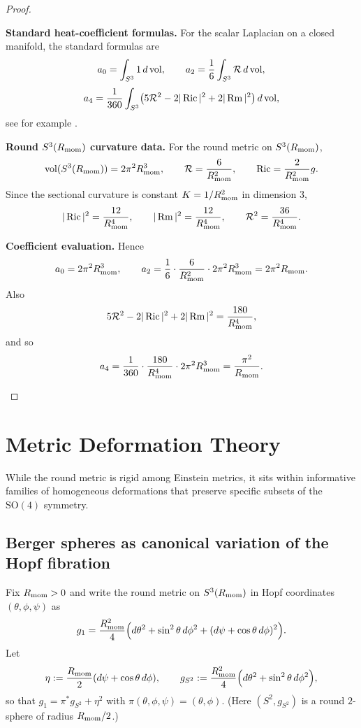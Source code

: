 \documentclass[11pt]{article}
\begin{document}
\begin{proof}

\begin{proofsteps}
\item \textbf{Standard heat-coefficient formulas.}
For the scalar Laplacian on a closed manifold, the standard formulas are
\[
a_0=\int_{S^3}1\,d\operatorname{vol},
\qquad
a_2=\frac16\int_{S^3}\mathcal R\,d\operatorname{vol},
\]
\[
a_4=\frac{1}{360}\int_{S^3}\bigl(5\mathcal R^2-2|\operatorname{Ric}|^2+2|\operatorname{Rm}|^2\bigr)\,d\operatorname{vol},
\]
see for example \cite{berline1992heat,gilkey1995invariance}.

\item \textbf{Round \(S^3(R_{\mathrm{mom}})\) curvature data.}
For the round metric on \(S^3(R_{\mathrm{mom}})\),
\[
\operatorname{vol}(S^3(R_{\mathrm{mom}}))=2\pi^2R_{\mathrm{mom}}^3,\qquad
\mathcal R=\frac{6}{R_{\mathrm{mom}}^2},\qquad
\operatorname{Ric}=\frac{2}{R_{\mathrm{mom}}^2}g.
\]
Since the sectional curvature is constant \(K=1/R_{\mathrm{mom}}^2\) in dimension \(3\),
\[
|\operatorname{Ric}|^2=\frac{12}{R_{\mathrm{mom}}^4},
\qquad
|\operatorname{Rm}|^2=\frac{12}{R_{\mathrm{mom}}^4},
\qquad
\mathcal R^2=\frac{36}{R_{\mathrm{mom}}^4}.
\]

\item \textbf{Coefficient evaluation.}
Hence
\[
a_0=2\pi^2R_{\mathrm{mom}}^3,
\qquad
a_2=\frac16\cdot \frac{6}{R_{\mathrm{mom}}^2}\cdot 2\pi^2R_{\mathrm{mom}}^3
=2\pi^2R_{\mathrm{mom}}.
\]
Also
\[
5\mathcal R^2-2|\operatorname{Ric}|^2+2|\operatorname{Rm}|^2
=
\frac{180}{R_{\mathrm{mom}}^4},
\]
and so
\[
a_4
=
\frac{1}{360}\cdot \frac{180}{R_{\mathrm{mom}}^4}\cdot 2\pi^2R_{\mathrm{mom}}^3
=
\frac{\pi^2}{R_{\mathrm{mom}}}.
\]
\end{proofsteps}
\end{proof}


\section{Metric Deformation Theory}
\label{p1:sec:metric-deformation}

While the round metric is rigid among Einstein metrics, it sits within informative families of homogeneous deformations that preserve specific subsets of the $\mathrm{SO}(4)$ symmetry.


\subsection{Berger spheres as canonical variation of the Hopf fibration}
\label{p1:sec:berger-collapse-rigorous}

Fix $R_{\mathrm{mom}}>0$ and write the round metric on $S^3(R_{\mathrm{mom}})$ in Hopf coordinates $(\theta,\phi,\psi)$ as
\begin{equation}\label{p1:eq:round-hopf}
g_{1}
=\frac{R_{\mathrm{mom}}^2}{4}\Big(d\theta^2+\sin^2\theta\,d\phi^2+(d\psi+\cos\theta\,d\phi)^2\Big).
\end{equation}
Let
\[
\eta:=\frac{R_{\mathrm{mom}}}{2}(d\psi+\cos\theta\,d\phi),\qquad
g_{S^2}:=\frac{R_{\mathrm{mom}}^2}{4}\Big(d\theta^2+\sin^2\theta\,d\phi^2\Big),
\]
so that $g_1=\pi^*g_{S^2}+\eta^2$ with $\pi(\theta,\phi,\psi)=(\theta,\phi)$.
(Here $(S^2,g_{S^2})$ is a round $2$-sphere of radius $R_{\mathrm{mom}}/2$.)
\end{document}
